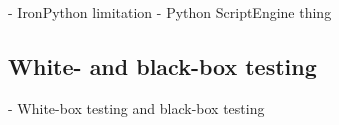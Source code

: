 - IronPython limitation
- Python ScriptEngine thing

\subsection{White- and black-box testing}

- White-box testing and black-box testing


